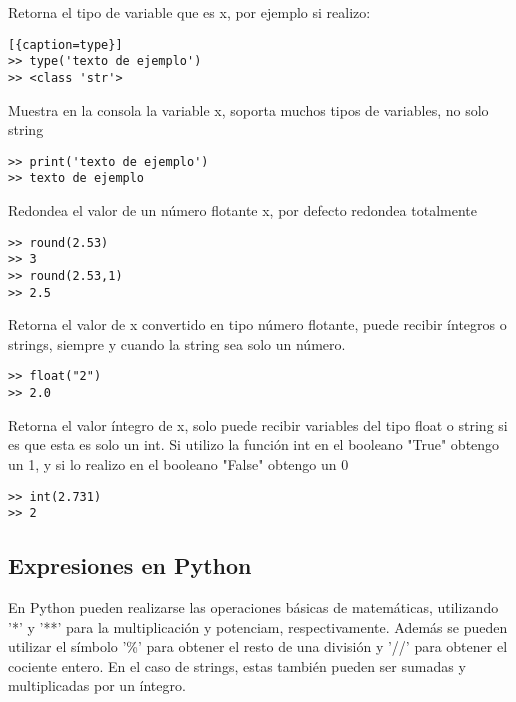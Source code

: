 \documentclass[10pt,a4paper]{article}
\begin{document}
\begin{description}[align=right,labelwidth=1cm,labelsep=0.5cm, itemindent=0cm]


\item [type(x)] Retorna el tipo de variable que es x, por ejemplo si realizo:
\begin{lstlisting}[{caption=type}]
>> type('texto de ejemplo')
>> <class 'str'>\end{lstlisting}
\item [print(x)] Muestra en la consola la variable x, soporta muchos tipos de variables, no solo string
	\begin{lstlisting}[caption={print}]
>> print('texto de ejemplo')
>> texto de ejemplo\end{lstlisting}
\item [round(x)] Redondea el valor de un número flotante x, por defecto redondea totalmente
	\begin{lstlisting}[caption={round}]
>> round(2.53)
>> 3
>> round(2.53,1)
>> 2.5\end{lstlisting}
\item [float(x)] Retorna el valor de x convertido en tipo número flotante, puede recibir íntegros o strings, siempre y cuando la string sea solo un número.
	\begin{lstlisting}[caption={float}]
>> float("2")
>> 2.0\end{lstlisting}

\item [int(x)] Retorna el valor íntegro de x, solo puede recibir variables del tipo float o string si es que esta es solo un int. Si utilizo la función int en el booleano "True" obtengo un 1, y si lo realizo en el booleano "False" obtengo un 0
	\begin{lstlisting}[caption={int}]
>> int(2.731)
>> 2\end{lstlisting}


\end{description}

\subsection{Expresiones en Python}
En Python pueden realizarse las operaciones básicas de matemáticas, utilizando '*' y '**' para la multiplicación y potenciam, respectivamente. Además se pueden utilizar el símbolo '\%' para obtener el resto de una división y '//' para obtener el cociente entero. En el caso de strings, estas también pueden ser sumadas y multiplicadas por un íntegro.
\end{document}
